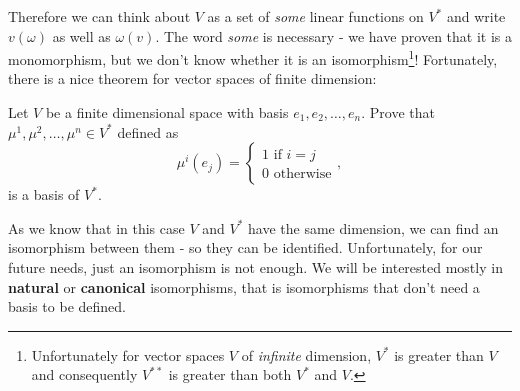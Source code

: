 Therefore we can think about $V$ as a set of \textit{some} linear functions on $V^*$ and write $v(\omega)$ as well as $\omega(v)$. The word \textit{some} is necessary -
we have proven that it is a monomorphism, but we don't know whether it is an isomorphism\footnote{Unfortunately for vector spaces $V$ of \textit{infinite} dimension, $V^*$ is greater than $V$ and consequently $V^{**}$ is greater than both $V^*$ and $V$.}! Fortunately, there is a nice theorem for vector spaces of finite dimension:

\begin{prob}
  Let $V$ be a finite dimensional space with basis $e_1,e_2,\dots,e_n$. Prove that $\mu^1, \mu^2,\dots,\mu^n\in V^*$ defined as
    $$\mu^i(e_j)=\begin{cases}1 \text{ if } i=j\\ 0 \text{ otherwise}\end{cases},$$
  is a basis of $V^*$.
\end{prob}

As we know that in this case $V$ and $V^*$ have the same dimension, we can find an isomorphism between them - so they can be identified.
Unfortunately, for our future needs, just an isomorphism is not enough. We will be interested mostly in \textbf{natural} or \textbf{canonical} isomorphisms, that
is isomorphisms that don't need a basis to be defined.
